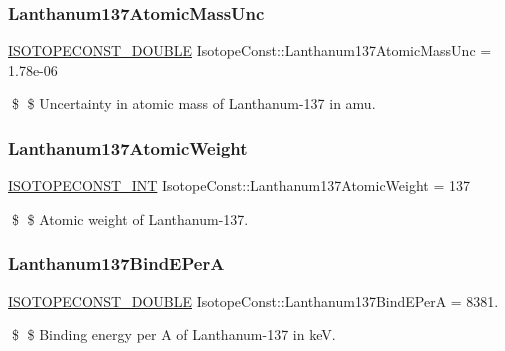 \subsubsection{\texorpdfstring{Lanthanum137\+Atomic\+Mass\+Unc}{Lanthanum137AtomicMassUnc}}
{\footnotesize\ttfamily \mbox{\hyperlink{group___isotope_const-_macros_ga8f45a7272ce02c0b4c65c44636ed719a}{I\+S\+O\+T\+O\+P\+E\+C\+O\+N\+S\+T\+\_\+\+D\+O\+U\+B\+LE}} Isotope\+Const\+::\+Lanthanum137\+Atomic\+Mass\+Unc = 1.\+78e-\/06}

\$ \$ Uncertainty in atomic mass of Lanthanum-\/137 in amu. \mbox{\label{group___isotope_const-_lanthanum-_la137_gac1b0eea20711530ec74333a89ebe9e59}} 
\subsubsection{\texorpdfstring{Lanthanum137\+Atomic\+Weight}{Lanthanum137AtomicWeight}}
{\footnotesize\ttfamily \mbox{\hyperlink{group___isotope_const-_macros_ga5f18360b3e99483a35c32d789e62621c}{I\+S\+O\+T\+O\+P\+E\+C\+O\+N\+S\+T\+\_\+\+I\+NT}} Isotope\+Const\+::\+Lanthanum137\+Atomic\+Weight = 137}

\$ \$ Atomic weight of Lanthanum-\/137. \mbox{\label{group___isotope_const-_lanthanum-_la137_ga8100d8c7ecdde5a628805fec6d5cfaa0}} 
\subsubsection{\texorpdfstring{Lanthanum137\+Bind\+E\+PerA}{Lanthanum137BindEPerA}}
{\footnotesize\ttfamily \mbox{\hyperlink{group___isotope_const-_macros_ga8f45a7272ce02c0b4c65c44636ed719a}{I\+S\+O\+T\+O\+P\+E\+C\+O\+N\+S\+T\+\_\+\+D\+O\+U\+B\+LE}} Isotope\+Const\+::\+Lanthanum137\+Bind\+E\+PerA = 8381.}

\$ \$ Binding energy per A of Lanthanum-\/137 in keV. \mbox{\label{group___isotope_const-_lanthanum-_la137_ga584801963816c96b81ded27c648e1a1a}} 
